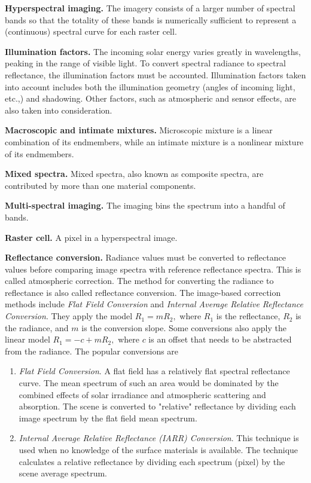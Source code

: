 \textbf{Hyperspectral imaging.} The imagery consists of a larger number of
spectral bands so that the totality of these bands is numerically sufficient
to represent a (continuous) spectral curve for each raster cell.

\textbf{Illumination factors.} The incoming solar energy varies greatly in
wavelengths, peaking in the range of visible light. To convert spectral
radiance to spectral reflectance, the illumination factors must be accounted.
Illumination factors taken into account includes both the illumination
geometry (angles of incoming light, etc.,) and shadowing. Other factors, such
as atmospheric and sensor effects, are also taken into consideration.

\textbf{Macroscopic and intimate mixtures.} Microscopic mixture is a linear
combination of its endmembers, while an intimate mixture is a nonlinear
mixture of its endmembers.

\textbf{Mixed spectra.} Mixed spectra, also known as composite spectra, are
contributed by more than one material components.

\textbf{Multi-spectral imaging.} The imaging bins the spectrum into a handful
of bands.

\textbf{Raster cell.} A pixel in a hyperspectral image.

\textbf{Reflectance conversion.} Radiance values must be converted to
reflectance values before comparing image spectra with reference reflectance
spectra. This is called atmospheric correction. The method for converting the
radiance to reflectance is also called reflectance conversion. The image-based
correction methods include \emph{Flat Field Conversion} and \emph{Internal
Average Relative Reflectance Conversion}. They apply the model $R_{1}=mR_{2},$
where $R_{1}$ is the reflectance, $R_{2}$ is the radiance, and $m$ is the
conversion slope. Some conversions also apply the linear model $R_{1}%
=-c+mR_{2},$ where $c$ is an offset that needs to be abstracted from the
radiance. The popular conversions are

\begin{enumerate}
\item \emph{Flat Field Conversion}. A flat field has a relatively flat
spectral reflectance curve. The mean spectrum of such an area would be
dominated by the combined effects of solar irradiance and atmospheric
scattering and absorption. The scene is converted to "relative" reflectance by
dividing each image spectrum by the flat field mean spectrum.

\item \emph{Internal Average Relative Reflectance (IARR) Conversion}. This
technique is used when no knowledge of the surface materials is available. The
technique calculates a relative reflectance by dividing each spectrum (pixel)
by the scene average spectrum.
\end{enumerate}

